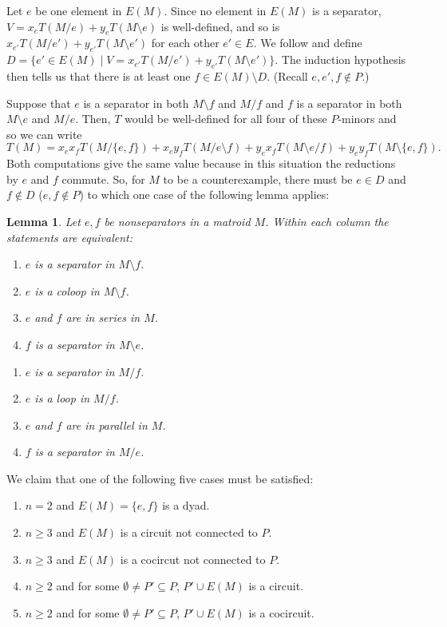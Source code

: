 \documentclass[12pt,leqno]{amsart}
\newtheorem{lem}{Lemma}
\theoremstyle{remark}
\begin{document}
Let $e$ be one element in $E(M)$.  Since no element in $E(M)$ is a 
separator, $V=x_{e} T(M/{e}) + y_{e} T(M\setminus {e})$ is well-defined, 
and so is $x_{e'} T(M/{e'}) + y_{e'} T(M\setminus {e'})$ 
for each other $e'\in E$.
We follow \cite{Ellis-Monaghan-Traldi} and define
$D=\{e'\in E(M) \mid V=x_{e'} T(M/{e'}) + y_{e'} T(M\setminus {e'})\}$.  The 
induction
hypothesis then tells us 
that there is at least 
one  $f\in E(M)\setminus D$.  
(Recall $e, e', f\not\in P$.)

Suppose that $e$ is a separator in both $M\setminus f$ and 
$M/f$ and $f$ is a separator in both 
$M\setminus e$ and $M/e$.  Then, 
$T$ would
be well-defined for all four of these $P$-minors and so
we can write 
\[
T(M)=x_e x_f T(M/\{e,f\}) + x_e y_f T(M/e\setminus f)
+ y_e x_f T(M\setminus e/f)
+ y_e y_f T(M\setminus\{e,f\}).
\]
Both computations give the same value because in this situation
the reductions by $e$ and $f$ commute.  
So, for $M$ to be a counterexample, there must be $e\in D$
and $f\not\in D$ ($e, f\not\in P$)
to which one case of the following lemma applies:


\begin{lem}
\cite{MR93a:05047}
Let $e , f$ be nonseparators in a matroid $M$. Within each column the
statements are equivalent:

\begin{minipage}{0.5\textwidth}
\begin{enumerate}
\item
$e$ is a separator in $M\setminus f$.
\item
$e$ is a coloop in $M\setminus f$.
\item
$e$ and $f$ are in series in $M$.
\item
$f$ is a separator in $M\setminus e$.
\end{enumerate}
\end{minipage}
\begin{minipage}{0.5\textwidth}
\begin{enumerate}
\item
$e$ is a separator in $M/ f$.
\item
$e$ is a loop in $M/ f$.
\item
$e$ and $f$ are in parallel in $M$.
\item
$f$  is a separator in $M/e$.
\end{enumerate}
\end{minipage}
\end{lem}

We claim that one of the following five cases must be satisfied:
\begin{enumerate}
\item 
$n=2$ and $E(M)=\{e,f\}$ is a dyad.
\item
$n\geq 3$ and $E(M)$ is a circuit not connected to $P$.
\item
$n\geq 3$ and $E(M)$ is a cocircut not connected to $P$.
\item
$n\geq 2$ and for some $\emptyset\neq P'\subseteq P$,
$P'\cup E(M)$ is a circuit.
\item
$n\geq 2$ and for some $\emptyset\neq P'\subseteq P$,
$P'\cup E(M)$ is a cocircuit.
\end{enumerate}
\end{document}

